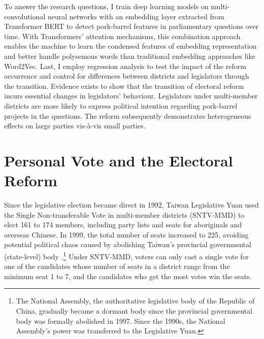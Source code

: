 To answer the research questions, I train deep learning models on multi-convolutional neural networks with an embedding layer extracted from Transformer BERT to detect pork-barrel features in parliamentary questions over time. With Transformers' attention mechanisms, this combination approach enables the machine to learn the condensed features of embedding representation and better handle polysemous words than traditional embedding approaches like Word2Vec. Last, I employ regression analysis to test the impact of the reform occurrence and control for differences between districts and legislators through the transition. Evidence exists to show that the transition of electoral reform incurs essential changes in legislators' behaviour. Legislators under multi-member districts are more likely to express political intention regarding pork-barrel projects in the questions. The reform subsequently demonstrates heterogeneous effects on large parties vis-à-vis small parties. 






\section*{\centering Personal Vote and the Electoral Reform}

Since the legislative election became direct in 1992, Taiwan Legislative Yuan used the Single Non-transferable Vote in multi-member districts (SNTV-MMD) to elect 161 to 174 members, including party lists and seats for aboriginals and overseas Chinese. In 1999, the total number of seats increased to 225, avoiding potential political chaos caused by abolishing Taiwan's provincial governmental (state-level) body \citep[][]{Wang1994}.\footnote{The National Assembly, the authoritative legislative body of the Republic of China, gradually became a dormant body since the provincial governmental body was formally abolished in 1997. Since the 1990s, the National Assembly's power was transferred to the Legislative Yuan. } Under SNTV-MMD, voters can only cast a single vote for one of the candidates whose number of seats in a district range from the minimum seat 1 to 7, and the candidates who get the most votes win the seats. 


